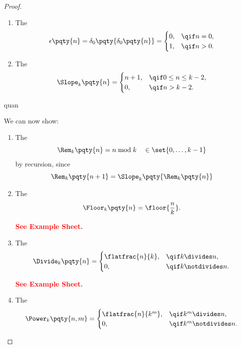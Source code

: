 \begin{proof}
\begin{enumerate}
        \item The 
        \[
            \epsilon\pqty{n} = \delta_0\pqty{\delta_0\pqty{n}} = \begin{cases}
                0, & \qif n = 0, \\
                1, & \qif n > 0.
            \end{cases}
        \]

        \item The 
        \[
            \Slope_k \pqty{n} = \begin{cases}
                n + 1, &\qif 0 \leq n \leq k - 2, \\
                0, &\qif n > k - 2.
            \end{cases}
        \]
    \end{enumerate}quan

    We can now show:
    \begin{enumerate}[resume]
        \item The 
        \[
            \Rem_k \pqty{n} = n \bmod k \quad \in \set{0, \ldots, k - 1}
        \]
        by recursion, since
        \[
            \Rem_k\pqty{n + 1} = \Slope_{k} \pqty{\Rem_k\pqty{n}}
        \]

        \item The 
        \[
            \Floor_k\pqty{n} = \floor{\frac{n}{k}}.
        \]

        \textbf{\textcolor{red}{See Example Sheet.}}

        \item The 
        \[
            \Divide_k\pqty{n} = \begin{cases}
                \flatfrac{n}{k}, &\qif k \divides n, \\
                0, & \qif k \notdivides n.
            \end{cases}
        \]

        \textbf{\textcolor{red}{See Example Sheet.}}

        \item The 
        \[
            \Power_k \pqty{n, m} = \begin{cases}
                \flatfrac{n}{k^m}, &\qif k^m \divides n, \\
                0, & \qif k^m \notdivides n.
            \end{cases}
        \]


\end{enumerate}
\end{proof}
